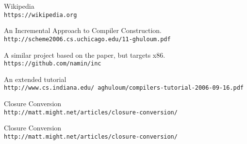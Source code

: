 \documentclass{article}
\begin{document}
\begin{thebibliography}{5}

Wikipedia
\\\texttt{https://wikipedia.org}

An Incremental Approach to Compiler Construction.
\\\texttt{http://scheme2006.cs.uchicago.edu/11-ghuloum.pdf}

A similar project based on the paper, but targets x86.
\\\texttt{https://github.com/namin/inc}

An extended tutorial 
\\\texttt{http://www.cs.indiana.edu/~aghuloum/compilers-tutorial-2006-09-16.pdf}

Closure Conversion
\\\texttt{http://matt.might.net/articles/closure-conversion/}

Closure Conversion
\\\texttt{http://matt.might.net/articles/closure-conversion/}

\end{thebibliography}  
\end{document}
